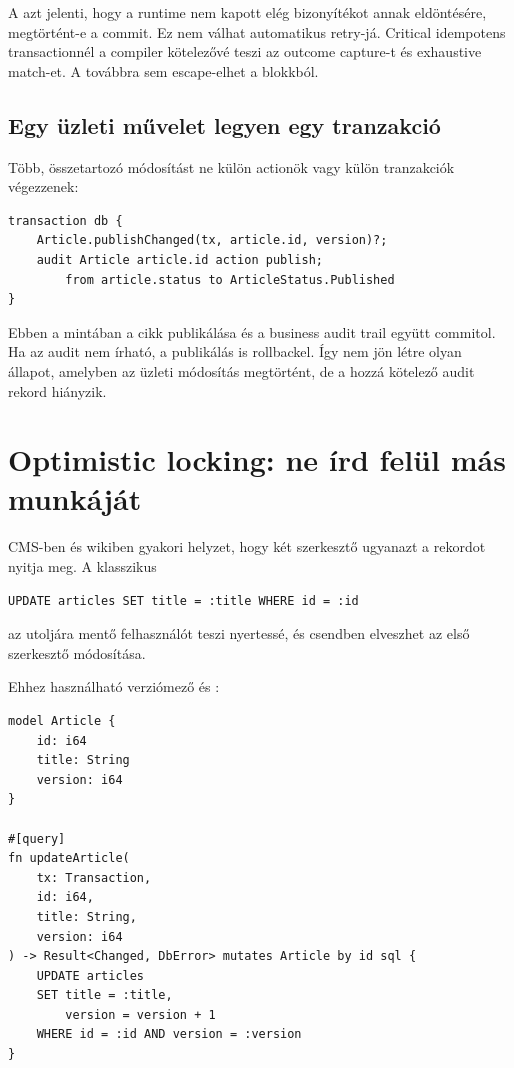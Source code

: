 A  azt jelenti, hogy a runtime nem kapott elég bizonyítékot annak eldöntésére, megtörtént-e a commit. Ez nem válhat automatikus retry-já. Critical idempotens transactionnél a compiler kötelezővé teszi az outcome capture-t és exhaustive match-et. A  továbbra sem escape-elhet a blokkból.

\subsection*{Egy üzleti művelet legyen egy tranzakció}

Több, összetartozó módosítást ne külön actionök vagy külön tranzakciók végezzenek:

\begin{lstlisting}[language=Velran]
transaction db {
    Article.publishChanged(tx, article.id, version)?;
    audit Article article.id action publish;
        from article.status to ArticleStatus.Published
}
\end{lstlisting}

Ebben a mintában a cikk publikálása és a business audit trail együtt commitol. Ha az audit nem írható, a publikálás is rollbackel. Így nem jön létre olyan állapot, amelyben az üzleti módosítás megtörtént, de a hozzá kötelező audit rekord hiányzik.

\section{Optimistic locking: ne írd felül más munkáját}

CMS-ben és wikiben gyakori helyzet, hogy két szerkesztő ugyanazt a rekordot nyitja meg. A klasszikus

\begin{lstlisting}
UPDATE articles SET title = :title WHERE id = :id
\end{lstlisting}

az utoljára mentő felhasználót teszi nyertessé, és csendben elveszhet az első szerkesztő módosítása.

Ehhez használható verziómező és :

\begin{lstlisting}[language=Velran]
model Article {
    id: i64
    title: String
    version: i64
}

#[query]
fn updateArticle(
    tx: Transaction,
    id: i64,
    title: String,
    version: i64
) -> Result<Changed, DbError> mutates Article by id sql {
    UPDATE articles
    SET title = :title,
        version = version + 1
    WHERE id = :id AND version = :version
}
\end{lstlisting}

